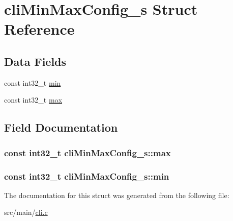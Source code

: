 \hypertarget{structcliMinMaxConfig__s}{\section{cli\+Min\+Max\+Config\+\_\+s Struct Reference}
\label{structcliMinMaxConfig__s}
}
\subsection*{Data Fields}
\begin{DoxyCompactItemize}
\item 
const int32\+\_\+t \hyperlink{structcliMinMaxConfig__s_aef0337664f542ae202f2bc9997a502d6}{min}
\item 
const int32\+\_\+t \hyperlink{structcliMinMaxConfig__s_ad90a3fb821a8794962d3c0e6833d9f0a}{max}
\end{DoxyCompactItemize}


\subsection{Field Documentation}
\hypertarget{structcliMinMaxConfig__s_ad90a3fb821a8794962d3c0e6833d9f0a}{
\subsubsection[{max}]{\setlength{\rightskip}{0pt plus 5cm}const int32\+\_\+t cli\+Min\+Max\+Config\+\_\+s\+::max}}\label{structcliMinMaxConfig__s_ad90a3fb821a8794962d3c0e6833d9f0a}
\hypertarget{structcliMinMaxConfig__s_aef0337664f542ae202f2bc9997a502d6}{
\subsubsection[{min}]{\setlength{\rightskip}{0pt plus 5cm}const int32\+\_\+t cli\+Min\+Max\+Config\+\_\+s\+::min}}\label{structcliMinMaxConfig__s_aef0337664f542ae202f2bc9997a502d6}


The documentation for this struct was generated from the following file\+:\begin{DoxyCompactItemize}
\item 
src/main/\hyperlink{cli_8c}{cli.\+c}\end{DoxyCompactItemize}
